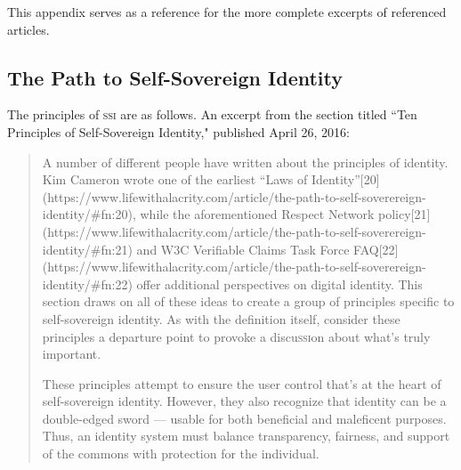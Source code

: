 \documentclass[twoside]{article}
\begin{document}
This appendix serves as a reference for the more complete excerpts of referenced articles.

\subsection{The Path to Self-Sovereign Identity}

The principles of \textsc{ssi} are as follows. An excerpt from the section titled ``Ten Principles of Self-Sovereign Identity," published April 26, 2016:

\begin{quote}
  A number of different people have written about the principles of identity. Kim Cameron wrote one of the earliest “Laws of Identity”[20](https://www.lifewithalacrity.com/article/the-path-to-self-soverereign-identity/#fn:20), while the aforementioned Respect Network policy[21](https://www.lifewithalacrity.com/article/the-path-to-self-soverereign-identity/#fn:21) and W3C Verifiable Claims Task Force FAQ[22](https://www.lifewithalacrity.com/article/the-path-to-self-soverereign-identity/#fn:22) offer additional perspectives on digital identity. This section draws on all of these ideas to create a group of principles specific to self-sovereign identity. As with the definition itself, consider these principles a departure point to provoke a discu\textsc{ssi}on about what’s truly important.

  These principles attempt to ensure the user control that’s at the heart of self-sovereign identity. However, they also recognize that identity can be a double-edged sword — usable for both beneficial and maleficent purposes. Thus, an identity system must balance transparency, fairness, and support of the commons with protection for the individual.


\end{quote}
\end{document}
